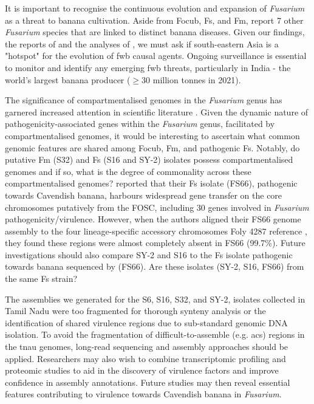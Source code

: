 It is important to recognise the continuous evolution and expansion of \textit{Fusarium} as a threat to banana cultivation. Aside from \ac{Focub}, \ac{Fs}, and \ac{Fm}, \textcite{Jones1997, Du2017} report 7 other \textit{Fusarium} species that are linked to distinct banana diseases. Given our findings, the reports of \textcite{Cui2021, Nozawa2023} and the analyses of \textcite{Maryani2019}, we must ask if south-eastern Asia is a "hotspot" for the evolution of \ac{fwb} causal agents. Ongoing surveillance is essential to monitor and identify any emerging \ac{fwb} threats, particularly in India - the world's largest banana producer ($\ge30$ million tonnes in 2021).

The significance of compartmentalised genomes in the \textit{Fusarium} genus has garnered increased attention in scientific literature \parencite{Ma2010, Ma2013, Sperschneider2015b, Frantzeskakis2019, Hoh2022, Kamble2024}. Given the dynamic nature of pathogenicity-associated genes within the \textit{Fusarium} genus, facilitated by compartmentalised genomes, it would be interesting to ascertain what common genomic features are shared among \ac{Focub}, \ac{Fm}, and pathogenic \ac{Fs}. Notably, do putative \ac{Fm} (S32) and \ac{Fs} (S16 and SY-2) isolates possess compartmentalised genomes and if so, what is the degree of commonality across these compartmentalised genomes? \textcite{Cui2021} reported that their \ac{Fs} isolate (FS66), pathogenic towards Cavendish banana, harbours widespread gene transfer on the core chromosomes putatively from the \acl{FOSC}, including 30 genes involved in \textit{Fusarium} pathogenicity/virulence. However, when the authors aligned their FS66 genome assembly to the four lineage-specific accessory chromosomes \ac{Foly} 4287 reference \parencite{Ma2010}, they found these regions were almost completely absent in FS66 (99.7\%). Future investigations should also compare SY-2 and S16 to the \ac{Fs} isolate pathogenic towards banana sequenced by \textcite{Cui2021} (FS66). Are these isolates (SY-2, S16, FS66) from the same \ac{Fs} strain?

The assemblies we generated for the S6, S16, S32, and SY-2,  isolates collected in Tamil Nadu were too fragmented for thorough synteny analysis or the identification of shared virulence regions due to sub-standard genomic DNA isolation. To avoid the fragmentation of difficult-to-assemble (e.g. \acp{ac}) regions in the \ac{tnau} genomes, long-read sequencing and assembly approaches should be applied. Researchers may also wish to combine transcriptomic profiling and proteomic studies to aid in the discovery of virulence factors and improve confidence in assembly annotations. Future studies may then reveal essential features contributing to virulence towards Cavendish banana in \textit{Fusarium}. 

